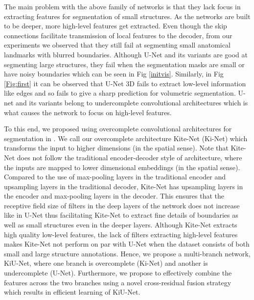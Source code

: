 \documentclass[journal,twoside,web]{ieeecolor}
\begin{document}
The main problem with the above family of networks is that they lack focus in extracting features for segmentation of small structures. As the networks are built to be deeper, more high-level features get extracted. Even though the skip connections facilitate transmission of local features to the decoder, from our experiments we observed that they still fail at segmenting small anatomical landmarks with blurred boundaries. Although U-Net and its variants are good at segmenting large structures, they fail when the segmentation masks are small or have noisy boundaries which can be seen in Fig \ref{initvis}. Similarly, in Fig \ref{Fig:first} it can be observed that U-Net 3D \cite{cciccek20163d} fails to extract low-level information like edges and so fails to give a sharp prediction for volumetric segmentation. U-net and its variants belong to undercomplete convolutional architectures which is what causes the network to focus on high-level features. 

To this end, we proposed using overcomplete convolutional architectures for segmentation in \cite{jose2020kiu}. We call our overcomplete architecture Kite-Net (Ki-Net) which transforms the input to higher dimensions (in the spatial sense). Note that Kite-Net does not follow the traditional  encoder-decoder style of architecture, where the inputs are mapped to lower dimensional embeddings (in the spatial sense). Compared to the use  of max-pooling layers in the traditional encoder and upsampling layers in the traditional decoder, Kite-Net has upsampling layers in the encoder and max-pooling layers in the decoder. This ensures  that the receptive field size of filters in the deep layers of the network does not increase like in U-Net thus facilitating Kite-Net to extract fine details of boundaries as well as small structures even in the deeper layers. Although Kite-Net extracts high quality low-level features, the lack of filters extracting  high-level features makes Kite-Net not perform on par with U-Net when the dataset consists of both small and large structure annotations. Hence, we propose a multi-branch network, KiU-Net, where one branch is overcomplete (Ki-Net) and another is undercomplete (U-Net).  Furthermore, we propose to effectively combine the features across the two branches  using a novel cross-residual fusion strategy which results in efficient learning of KiU-Net.
\end{document}
